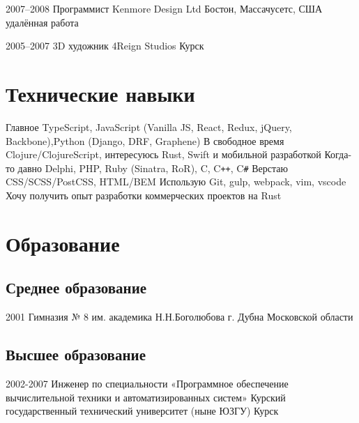 \documentclass[11pt,a4paper,sans]{moderncv}
\newcommand{\lang}[2]{#1}
\begin{document}
\cventry
  {2007--2008}
  {\lang
    {Программист}
    {Developer}}
  {Kenmore Design Ltd}
  {\lang
    {Бостон, Массачусетс, США}
    {Boston, MA, US}}
  {\lang
    {удалённая работа}
    {remote work}}
  {}

\cventry
  {2005--2007}
  {\lang
    {3D художник}
    {3D Artist}}
  {4Reign Studios}
  {\lang
    {Курск}
    {Kursk}}
  {}
  {}



\section
  {\lang
    {Технические навыки}
    {Technical Skills}}
\cvline
  {Главное}
  {TypeScript, JavaScript (Vanilla JS, React, Redux, jQuery, Backbone),\newline Python (Django, DRF, Graphene)}
\cvline
  {В свободное время}
  {Clojure/ClojureScript, интересуюсь Rust, Swift и мобильной разработкой}
\cvline
  {Когда-то давно}
  {Delphi, PHP, Ruby (Sinatra, RoR), C, C\texttt{++}, C\texttt{\#}}
\cvline
  {Верстаю}
  {CSS/SCSS/PostCSS, HTML/BEM}
\cvline
  {Использую}
  {Git, gulp, webpack, vim, vscode}
\cvline
  {Хочу получить опыт}
  {разработки коммерческих проектов на Rust}



\section
  {\lang
    {Образование}
    {Education}}
\subsection
  {\lang
    {Среднее образование}
    {Secondary school }}
\cventry
  {2001}
  {Гимназия № 8 им. академика Н.Н.Боголюбова}
  {г. Дубна Московской области}
  {}
  {}
  {}
\subsection
  {\lang
    {Высшее образование}
    {Higher education}}
\cventry
  {2002-2007}
  {Инженер по специальности «Программное обеспечение вычислительной техники и автоматизированных систем»}
  {Курский государственный технический университет (ныне ЮЗГУ)}
  {Курск}
  {}
  {}
\end{document}
